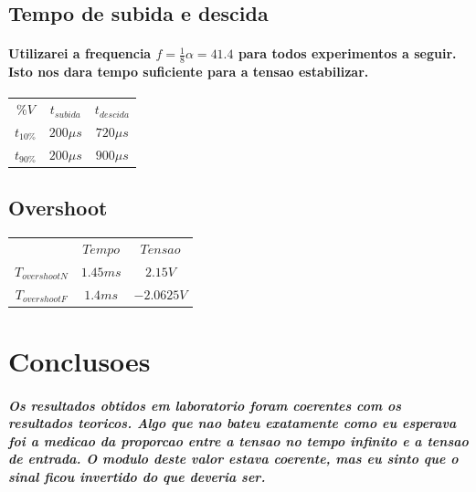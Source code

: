 \documentclass[12pt,twoside, a4paper, twocolumn]{article}
\begin{document}
\subsection{Tempo de subida e descida}

\paragraph*{Utilizarei a frequencia $f = \frac{1}{8} \alpha = 41.4$ para todos experimentos a seguir. Isto nos dara tempo suficiente para a tensao estabilizar.}

\begin{center}
    \begin{tabular}{ |ccc| }
        \hline
        $\%V$      & $t_{subida}$ & $t_{descida}$ \\
        $t_{10\%}$ & $200\mu s$   & $720 \mu s$   \\
        $t_{90\%}$ & $200\mu s$   & $900 \mu s$   \\
        \hline
    \end{tabular}
\end{center}

\subsection{Overshoot}

\begin{center}
    \begin{tabular}{ |ccc| }
        \hline
        $\,$             & $Tempo$  & $Tensao$   \\
        $T_{overshootN}$ & $1.45ms$ & $2.15V$    \\
        $T_{overshootF}$ & $1.4ms$  & $-2.0625V$ \\
        \hline
    \end{tabular}
\end{center}

\section{Conclusoes}

\subparagraph*{Os resultados obtidos em laboratorio foram coerentes com os resultados teoricos. Algo que nao bateu exatamente como eu esperava foi a medicao da proporcao entre a tensao no tempo infinito e a tensao de entrada. O modulo deste valor estava coerente, mas eu sinto que o sinal ficou invertido do que deveria ser.}
\end{document}
